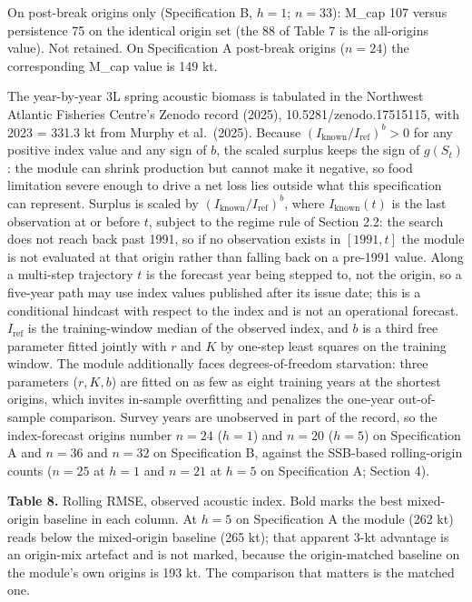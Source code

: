\documentclass[11pt]{article}
\begin{document}
On post-break origins only (Specification B, \(h=1\); \(n=33\)): M\_cap
107 versus persistence 75 on the identical origin set (the 88 of Table 7
is the all-origins value). Not retained. On Specification A post-break
origins (\(n=24\)) the corresponding M\_cap value is 149 kt.

The year-by-year 3L spring acoustic biomass is tabulated in the
Northwest Atlantic Fisheries Centre's Zenodo record (2025),
10.5281/zenodo.17515115, with 2023 = 331.3 kt from Murphy et al.~(2025).
Because \((I_{\mathrm{known}}/I_{\mathrm{ref}})^{b}>0\) for any
positive index value and any sign of \(b\), the scaled surplus keeps the
sign of \(g(S_t)\): the module can shrink production but cannot make it
negative, so food limitation severe enough to drive a net loss lies
outside what this specification can represent. Surplus is scaled by
\((I_{\mathrm{known}}/I_{\mathrm{ref}})^{b}\),
where \(I_{\mathrm{known}}(t)\) is the last observation at or before
\(t\), subject to the regime rule of Section 2.2: the search does not
reach back past 1991, so if no observation exists in \([1991, t]\) the
module is not evaluated at that origin rather than falling back on a
pre-1991 value. Along a multi-step trajectory \(t\) is the forecast
year being stepped to, not the origin, so a five-year path may use index
values published after its issue date; this is a conditional hindcast
with respect to the index and is not an operational forecast. \(I_{\mathrm{ref}}\) is the training-window median of the
observed index, and \(b\) is a third free parameter fitted jointly with
\(r\) and \(K\) by one-step least squares on the training window. The
module additionally faces degrees-of-freedom starvation: three
parameters (\(r, K, b\)) are fitted on as few as eight training years at
the shortest origins, which invites in-sample overfitting and penalizes
the one-year out-of-sample comparison. Survey years are unobserved in
part of the record, so the index-forecast origins number \(n=24\)
(\(h=1\)) and \(n=20\) (\(h=5\)) on Specification A and \(n=36\) and
\(n=32\) on Specification B, against the SSB-based rolling-origin counts
(\(n=25\) at \(h=1\) and \(n=21\) at \(h=5\) on Specification A; Section
4).

\textbf{Table 8.} Rolling RMSE, observed acoustic index. Bold marks the
best mixed-origin baseline in each column. At \(h=5\) on Specification A
the module (262 kt) reads below the mixed-origin baseline (265 kt); that
apparent 3-kt advantage is an origin-mix artefact and is not marked,
because the origin-matched baseline on the module's own origins is
193 kt. The comparison that matters is the matched one.
\end{document}
